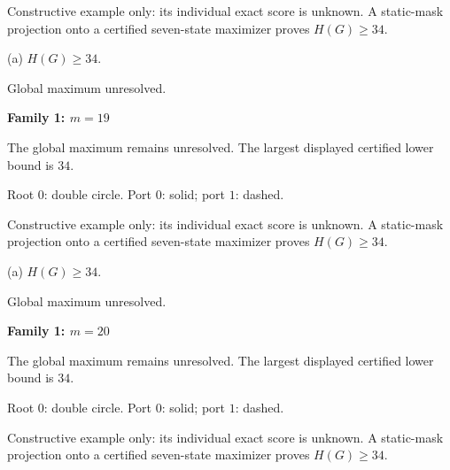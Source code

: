 \documentclass[10pt,a4paper]{article}
\begin{document}
\vspace{3mm}
{\small Constructive example only: its individual exact score is unknown. A static-mask projection onto a certified seven-state maximizer proves $H(G)\ge34$.}\par\vspace{2mm}
\noindent\hfill
\begin{minipage}[t]{.96\textwidth}\centering
\resizebox{14cm}{!}{}\par
{\footnotesize (a) $H(G)\ge 34$.\par Global maximum unresolved.}\par
\end{minipage}\hfill
\par\vspace{2.5mm}
\clearpage
{\Large\bfseries Family 1: $m=19$}\par
\vspace{2mm}
{\small The global maximum remains unresolved. The largest displayed certified lower bound is $34$.}\par
\vspace{1mm}
{\small Root $0$: double circle. Port $0$: solid; port $1$: dashed.}\par
\vspace{3mm}
{\small Constructive example only: its individual exact score is unknown. A static-mask projection onto a certified seven-state maximizer proves $H(G)\ge34$.}\par\vspace{2mm}
\noindent\hfill
\begin{minipage}[t]{.96\textwidth}\centering
\resizebox{14cm}{!}{}\par
{\footnotesize (a) $H(G)\ge 34$.\par Global maximum unresolved.}\par
\end{minipage}\hfill
\par\vspace{2.5mm}
\clearpage
{\Large\bfseries Family 1: $m=20$}\par
\vspace{2mm}
{\small The global maximum remains unresolved. The largest displayed certified lower bound is $34$.}\par
\vspace{1mm}
{\small Root $0$: double circle. Port $0$: solid; port $1$: dashed.}\par
\vspace{3mm}
{\small Constructive example only: its individual exact score is unknown. A static-mask projection onto a certified seven-state maximizer proves $H(G)\ge34$.}\par\vspace{2mm}
\end{document}
